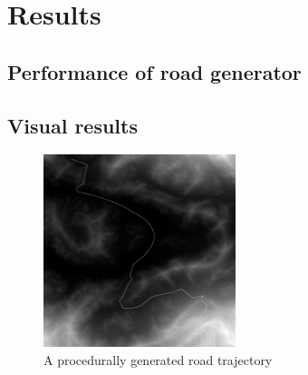 \chapter{Results}
\label{chap:results}

\section{Performance of road generator}

\section{Visual results}

\begin{figure}[ht]
\centering
\includegraphics[width=0.5\textwidth]{figure/generated_road_trajectory}
\caption{A procedurally generated road trajectory}
\label{fig:road_trajectory}
\end{figure}

